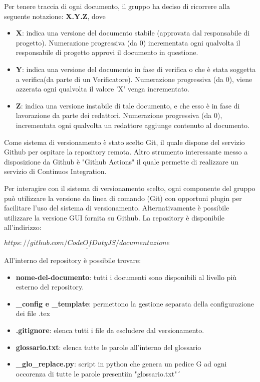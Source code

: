 			Per tenere traccia di ogni documento, il gruppo ha deciso di ricorrere alla seguente notazione: \textbf{X.Y.Z}, dove
			\begin{itemize}
				
				\item \textbf{X}: indica una versione del documento stabile (approvata dal responsabile di progetto). Numerazione progressiva (da 0) incrementata ogni qualvolta il responsabile di progetto approvi il documento in questione.
				
				\item \textbf{Y}: indica una versione del documento in fase di verifica o che è stata soggetta a verifica(da parte di un Verificatore). Numerazione progressiva (da 0), viene azzerata ogni qualvolta il valore 'X' venga incrementato.
				
				\item \textbf{Z}: indica una versione instabile di tale documento, e che esso è in fase di lavorazione da parte dei redattori. Numerazione progressiva (da 0), incrementata ogni qualvolta un redattore aggiunge contenuto al documento.
			\end{itemize}
			
			Come sistema di versionamento è stato scelto Git, il quale dispone del servizio Github per ospitare la repository remota. Altro strumento interessante messo a disposizione da Github è "Github Actions" il quale permette di realizzare un servizio di Continuos Integration.
			
			Per interagire con il sistema di versionamento scelto, ogni componente del gruppo può utilizzare la versione da linea di comando (Git) con opportuni plugin per facilitare l'uso del sistema di versionamento. Alternativamente è possibile utilizzare la versione GUI fornita su Github. La repository è disponibile all'indirizzo:\\
			\begin{center}
				$\underline{https://github.com/CodeOfDutyJS/documentazione}$
			\end{center}
			
			All'interno del repository è possibile trovare:
			\begin{itemize}
				\item \textbf{nome-del-documento}: tutti i documenti sono disponibili al livello più esterno del repository.
				\item \textbf{\_config e \_template}: permettono la gestione separata della configurazione dei file .tex
				\item \textbf{.gitignore}: elenca tutti i file da escludere dal versionamento.
				\item \textbf{glossario.txt}: elenca tutte le parole all'interno del glossario
				\item \textbf{\_glo\_replace.py}: script in python che genera un pedice G ad ogni occorenza di tutte le parole presentiin "glossario.txt"´
			\end{itemize}
			
